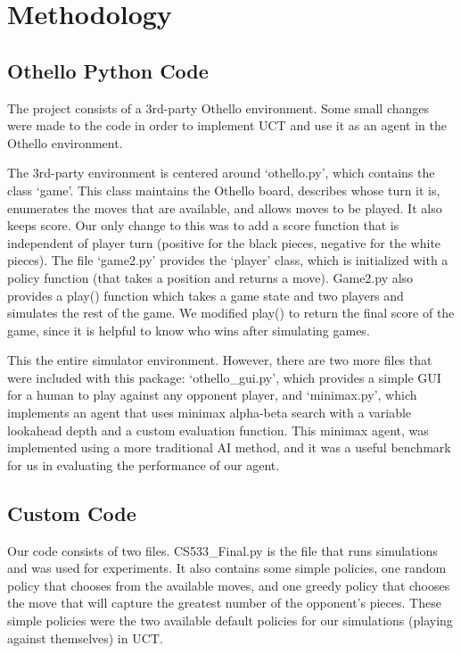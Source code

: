 \documentclass[12pt,letterpaper]{article}
\begin{document}
\section{Methodology}
\label{meth}

\subsection{Othello Python Code}

The project consists of a 3rd-party Othello environment. Some small changes were made to the code in order to implement UCT and use it as an agent in the Othello environment.

The 3rd-party environment is centered around `othello.py', which contains the class `game'. This class maintains the Othello board, describes whose turn it is, enumerates the moves that are available, and allows moves to be played. It also keeps score. Our only change to this was to add a score function that is independent of player turn (positive for the black pieces, negative for the white pieces). The file `game2.py' provides the `player' class, which is initialized with a policy function (that takes a position and returns a move). Game2.py also provides a play() function which takes a game state and two players and simulates the rest of the game. We modified play() to return the final score of the game, since it is helpful to know who wins after simulating games. 

This the entire simulator environment. However, there are two more files that were included with this package: `othello\_gui.py', which provides a simple GUI for a human to play against any opponent player, and `minimax.py', which implements an agent that uses minimax alpha-beta search with a variable lookahead depth and a custom evaluation function. This minimax agent, was implemented using a more traditional AI method, and it was a useful benchmark for us in evaluating the performance of our agent.

\subsection{Custom Code}

Our code consists of two files. CS533\_Final.py is the file that runs simulations and was used for experiments. It also contains some simple policies, one random policy that chooses from the available moves, and one greedy policy that chooses the move that will capture the greatest number of the opponent's pieces. These simple policies were the two available default policies for our simulations (playing against themselves) in UCT.
\end{document}
